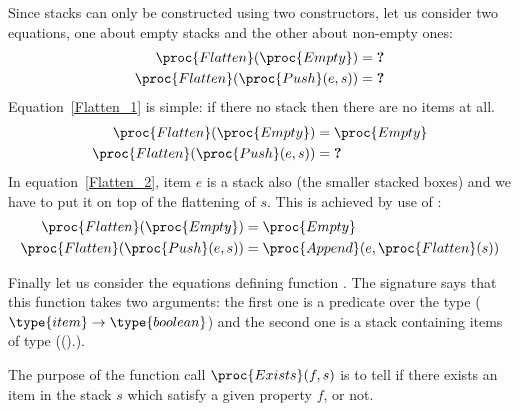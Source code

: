   Since stacks can only be constructed using two constructors, let us
  consider two equations, one about empty stacks and the other about
  non-empty ones:
  \begin{align}
     \proc{Flatten} (\proc{Empty}) 
  &= \textbf{?} \label{Flatten_1}\\
     \proc{Flatten} (\proc{Push} (e, s))
  &= \textbf{?} \label{Flatten_2}
  \end{align}
  Equation~\ref{Flatten_1} is simple: if there no stack then there are
  no items at all.
  \begin{align*}
     \proc{Flatten} (\proc{Empty}) 
  &= \proc{Empty}\\
     \proc{Flatten} (\proc{Push} (e, s))
  &= \textbf{?}
  \end{align*}
  In equation~\ref{Flatten_2}, item \(e\) is a stack also (the
  smaller stacked boxes) and we have to put it on top of the
  flattening of \(s\). This is achieved by use of :
  \begin{align*}
     \proc{Flatten} (\proc{Empty}) 
  &= \proc{Empty}\\
     \proc{Flatten} (\proc{Push} (e, s))
  &= \proc{Append} (e, \proc{Flatten} (s))
  \end{align*}
  
  Finally let us consider the equations defining function
  . The signature says that this function takes two
  arguments: the first one is a predicate over the type 
  (\(\type{item} \rightarrow \type{boolean}\))
  and the second one is a stack containing items of type 
  (().).

  The purpose of the function call \(\proc{Exists} (f, s)\)
  is to tell if there exists an item in the stack \(s\) which
  satisfy a given property \(f\), or not.


